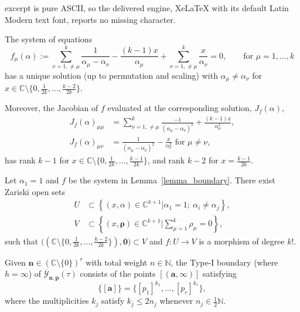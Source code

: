 \documentclass[10pt,a4paper]{amsart}
\begin{document}
excerpt is pure ASCII, so the delivered engine, XeLaTeX with its default Latin Modern text font, reports no missing character.
\begin{lemma} \label{lemma_boundary}
The system of equations
\begin{equation} \label{equation_boundary}
    f_{\mu}(\alpha) := \sum_{\nu=1, \neq \mu}^k \frac{1}{\alpha_{\mu} - \alpha_{\nu}} - \frac{(k-1)x}{\alpha_{\mu}} + \sum_{\nu=1, \neq \mu}^k \frac{x}{\alpha_{\nu}} =0, \qquad \mbox{for $\mu =1 ,\dots,k$}
\end{equation}
has a unique solution (up to permutation and scaling) with $\alpha_\mu \neq \alpha_\nu$ for $x \in \mathbb{C}\setminus\{ 0, \frac{1}{2k}, \dots, \frac{k-2}{2k} \}$. 

Moreover, the Jacobian of $f$ evaluated at the corresponding solution, $J_f(\alpha)$,
\[
\begin{split}
    J_f(\alpha)_{\mu\mu} &= \sum_{\nu=1,\neq \mu}^k \frac{-1}{(\alpha_\mu-\alpha_\nu)^2} + \frac{(k-1)x}{\alpha_\mu^2}, 
    \\
    J_f(\alpha)_{\mu\nu} &= \frac{1}{(\alpha_\mu - \alpha_\nu)^2} - \frac{x}{\alpha_\nu^2} \text{ for } \mu \neq \nu,
\end{split}
\]
has rank $k-1$ for $x \in \mathbb{C}\setminus\{0, \frac{1}{2k}, \dots, \frac{k-1}{2k}\}$, and rank $k-2$ for $x = \frac{k-1}{2k}$. 
\end{lemma}

\begin{corollary} \label{cor_boundary}
Let $\alpha_1=1$ and $f$ be the system in Lemma~\ref{lemma_boundary}. There exist Zariski open sets 
\[
\begin{split}
    U &\subset \left\{ (x,\alpha)\in \mathbb{C}^{k+1} | \alpha_1=1; \ \alpha_i \neq \alpha_j   \right\},
    \\
    V &\subset \left\{ (x, \boldsymbol{\rho}) \in \mathbb{C}^{k+1} \Big| \sum_{\mu=1}^k \rho_\mu =0 \right\},
\end{split}
\]
such that $\Big( (\mathbb{C}\setminus\{ 0, \frac{1}{2k}, \dots,\frac{k-2}{2k} \}), \mathbf{0} \Big) \subset V$ and $f: U \rightarrow V$ is a morphism of degree $k!$.
\end{corollary}

\begin{theorem} \label{special-pt}
Given $\mathbf{n} \in (\mathbb{C} \setminus \{0\} )^r$ with total weight $n\in \mathbb{N}$,
the Type-I boundary (where $h=\infty$) of $\overline{\mathcal{Y}}_{\mathbf{n},\mathbf{p}}(\tau)$ consists of the points $[(\mathbf{a}, \infty)]$ satisfying
\[
    \{[\mathbf{a}]\} = \{[p_1]^{k_1}, \dots, [p_r]^{k_r}\},
\]
where the multiplicities $k_j$ satisfy $k_j \leq 2n_j$ whenever $n_j \in \frac{1}{2}\mathbb{N}$.
\end{theorem}
\end{document}
